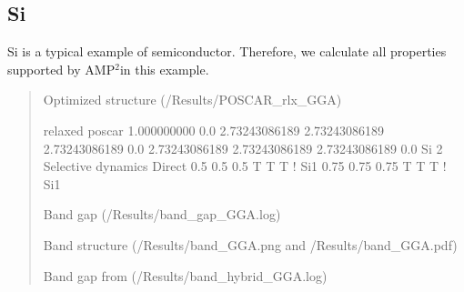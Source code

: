 \documentclass[letterpaper,10pt,english]{sphinxmanual}
\let\sphinxpxdimen\pdfpxdimen\else\newdimen\sphinxpxdimen
\begin{document}
\subsection{Si}
\label{\detokenize{Examples/Examples:si}}
Si is a typical example of semiconductor. Therefore, we calculate all properties supported by AMP$^{\text{2}}$in this example.
\begin{quote}

Optimized structure (/Results/POSCAR\_rlx\_GGA)

\begin{sphinxVerbatim}[commandchars=\\\{\}]
relaxed poscar
1.000000000
    0.0    2.73243086189    2.73243086189
    2.73243086189    \PYGZhy{}0.0    2.73243086189
    2.73243086189    2.73243086189    0.0
    Si
    2
Selective dynamics
Direct
    0.5    0.5    0.5  T  T  T ! Si1
    0.75    0.75    0.75  T  T  T ! Si1
\end{sphinxVerbatim}

Band gap (/Results/band\_gap\_GGA.log)

\begin{sphinxVerbatim}[commandchars=\\\{\}]
         

               
               

    
    
\end{sphinxVerbatim}

Band structure (/Results/band\_GGA.png and /Results/band\_GGA.pdf)
\begin{quote}

\noindent\sphinxincludegraphics[width=300\sphinxpxdimen]{{band_GGA}.png}
\end{quote}

Band gap from  (/Results/band\_hybrid\_GGA.log)

\begin{sphinxVerbatim}[commandchars=\\\{\}]
         


\end{sphinxVerbatim}
\end{quote}
\end{document}
